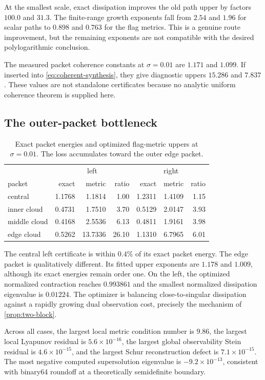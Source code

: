 \documentclass[11pt]{article}
\theoremstyle{remark}
\begin{document}
At the smallest scale, exact dissipation improves the old path upper by
factors $100.0$ and $31.3$.  The finite-range growth exponents fall from
$2.54$ and $1.96$ for scalar paths to $0.898$ and $0.763$ for the flag
metrics.  This is a genuine route improvement, but the remaining exponents
are not compatible with the desired polylogarithmic conclusion.

The measured packet coherence constants at $\sigma=0.01$ are $1.171$ and
$1.099$.  If inserted into \eqref{eq:coherent-synthesis}, they give
diagnostic uppers $15.286$ and $7.837$.  These values are not standalone
certificates because no analytic uniform coherence theorem is supplied
here.

\subsection{The outer-packet bottleneck}

\begin{table}[H]
\centering
\small
\begin{tabular}{@{}l|rrr|rrr@{}}
\toprule
&\multicolumn{3}{c|}{left}&\multicolumn{3}{c}{right}\\
packet&exact&metric&ratio&exact&metric&ratio\\
\midrule
central&1.1768&1.1814&1.00&1.2311&1.4109&1.15\\
inner cloud&0.4731&1.7510&3.70&0.5129&2.0147&3.93\\
middle cloud&0.4168&2.5536&6.13&0.4811&1.9161&3.98\\
edge cloud&0.5262&13.7336&26.10&1.1310&6.7965&6.01\\
\bottomrule
\end{tabular}
\caption{Exact packet energies and optimized flag-metric uppers at
$\sigma=0.01$.  The loss accumulates toward the outer edge packet.}
\label{tab:packets}
\end{table}

The central left certificate is within $0.4\%$ of its exact packet energy.
The edge packet is qualitatively different.  Its fitted upper exponents are
$1.178$ and $1.009$, although its exact energies remain order one.  On the
left, the optimized normalized contraction reaches $0.993861$ and the
smallest normalized dissipation eigenvalue is $0.01224$.  The optimizer is
balancing close-to-singular dissipation against a rapidly growing dual
observation cost, precisely the mechanism of \cref{prop:two-block}.

Across all cases, the largest local metric condition number is $9.86$, the
largest local Lyapunov residual is $5.6\times10^{-16}$, the largest global
observability Stein residual is $4.6\times10^{-15}$, and the largest Schur
reconstruction defect is $7.1\times10^{-15}$.  The most negative computed
supersolution eigenvalue is $-9.2\times10^{-13}$, consistent with binary64
roundoff at a theoretically semidefinite boundary.
\end{document}
